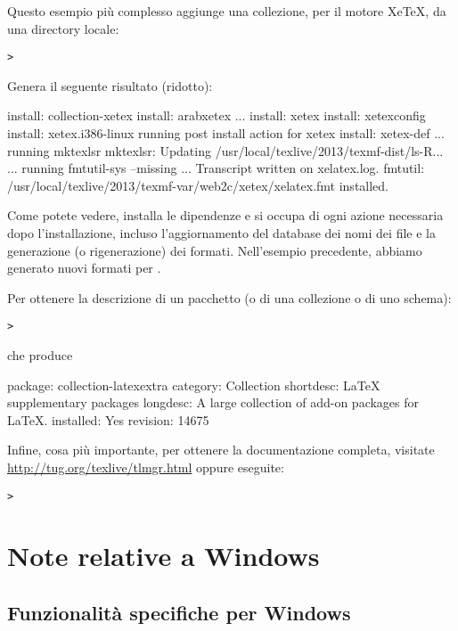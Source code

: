 \documentclass{article}
\begin{document}
Questo esempio più complesso aggiunge una collezione, per il motore
Xe\TeX, da una directory locale:

\begin{alltt}
> 
\end{alltt}
Genera il seguente risultato (ridotto):
\begin{fverbatim}
install: collection-xetex
install: arabxetex
...
install: xetex
install: xetexconfig
install: xetex.i386-linux
running post install action for xetex
install: xetex-def
...
running mktexlsr
mktexlsr: Updating /usr/local/texlive/2013/texmf-dist/ls-R...
...
running fmtutil-sys --missing
...
Transcript written on xelatex.log.
fmtutil: /usr/local/texlive/2013/texmf-var/web2c/xetex/xelatex.fmt installed.
\end{fverbatim}

Come potete vedere,  installa le dipendenze e si occupa di ogni
azione necessaria dopo l'installazione, incluso l'aggiornamento del
database dei nomi dei file e la generazione (o rigenerazione) dei formati.
Nell'esempio precedente, abbiamo generato nuovi formati per \XeTeX.

Per ottenere la descrizione di un pacchetto (o di una collezione o di uno
schema):
\begin{alltt}
> 
\end{alltt}
che produce
\begin{fverbatim}
package:    collection-latexextra
category:   Collection
shortdesc:  LaTeX supplementary packages
longdesc:   A large collection of add-on packages for LaTeX.
installed:  Yes
revision:   14675
\end{fverbatim}

Infine, cosa più importante, per ottenere la documentazione completa,
visitate \url{http://tug.org/texlive/tlmgr.html} oppure eseguite:
\begin{alltt}
> 
\end{alltt}


\section{Note relative a Windows}
\label{sec:windows}


\subsection{Funzionalità specifiche per Windows}
\label{sec:winfeatures}
\end{document}

